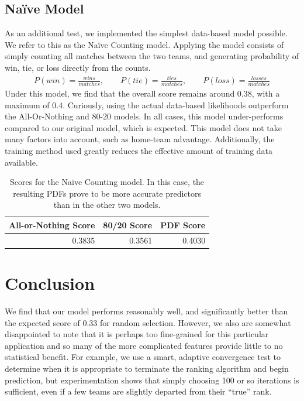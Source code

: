 \documentclass{llncs}
\begin{document}
\subsection{Na\"ive Model}
As an additional test, we implemented the simplest data-based model possible. We refer to this as the Na\"ive Counting model. Applying the model consists of simply counting all matches between the two teams, and generating probability of win, tie, or loss directly from the counts.
\begin{align*}
    P(win) = \frac{wins}{matches}, \qquad
    P(tie) = \frac{ties}{matches}, \qquad
    P(loss) = \frac{losses}{matches}
\end{align*}
Under this model, we find that the overall score remains around 0.38, with a maximum of 0.4. Curiously, using the actual data-based likelihoods outperform the All-Or-Nothing and 80-20 models. In all cases, this model under-performs compared to our original model, which is expected. This model does not take many factors into account, such as home-team advantage. Additionally, the training method used greatly reduces the effective amount of training data available.
\begin{table}
    \centering
    \begin{tabular}{r|r|r}
        All-or-Nothing Score & 80/20 Score & PDF Score \\
        \hline
        0.3835 & 0.3561 & 0.4030 \\
    \end{tabular}
    \caption{Scores for the Na\"ive Counting model. In this case, the resulting PDFs prove to be more accurate predictors than in the other two models.}
    \label{tab:naive}
\end{table}


\section{Conclusion}
We find that our model performs reasonably well, and significantly better than the expected score of 0.33 for random selection. However, we also are somewhat disappointed to note that it is perhaps too fine-grained for this particular application and so many of the more complicated features provide little to no statistical benefit. For example, we use a smart, adaptive convergence test to determine when it is appropriate to terminate the ranking algorithm and begin prediction, but experimentation shows that simply choosing 100 or so iterations is sufficient, even if a few teams are slightly departed from their ``true'' rank.
\end{document}
